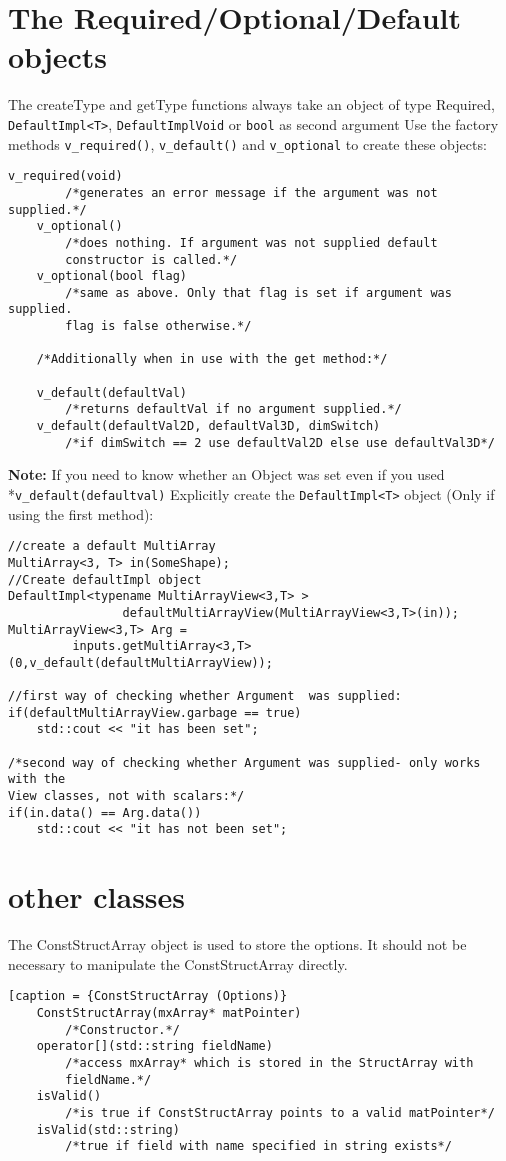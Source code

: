 \documentclass[a4paper,10pt]{article}
\begin{document}
\section{The Required/Optional/Default objects}
The createType and getType functions always take an object of type Required, 
\verb+DefaultImpl<T>+,  \verb+DefaultImplVoid+ or \verb+bool+ as second argument 
Use the factory methods \verb+v_required()+, \verb+v_default()+ and 
\verb+v_optional+ to create these objects:

\begin{lstlisting}[caption={Behavior of the get/set functions with the factory objects}]
	v_required(void)
		/*generates an error message if the argument was not supplied.*/
	v_optional()
		/*does nothing. If argument was not supplied default 
		constructor is called.*/
	v_optional(bool flag)
		/*same as above. Only that flag is set if argument was supplied. 
		flag is false otherwise.*/
	
	/*Additionally when in use with the get method:*/
	
	v_default(defaultVal)
		/*returns defaultVal if no argument supplied.*/
	v_default(defaultVal2D, defaultVal3D, dimSwitch)
		/*if dimSwitch == 2 use defaultVal2D else use defaultVal3D*/
\end{lstlisting}

\textbf{Note:} 	If you need to know whether an Object was set even if you used \\*\verb+v_default(defaultval)+
	Explicitly create the \verb+DefaultImpl<T>+ object (Only if using the first method):

\begin{lstlisting}[caption={Finding out whether a default object was set}]	
//create a default MultiArray
MultiArray<3, T> in(SomeShape);
//Create defaultImpl object
DefaultImpl<typename MultiArrayView<3,T> > 
				defaultMultiArrayView(MultiArrayView<3,T>(in));
MultiArrayView<3,T> Arg = 
		 inputs.getMultiArray<3,T>(0,v_default(defaultMultiArrayView));

//first way of checking whether Argument  was supplied:
if(defaultMultiArrayView.garbage == true) 
	std::cout << "it has been set";

/*second way of checking whether Argument was supplied- only works with the 
View classes, not with scalars:*/
if(in.data() == Arg.data()) 
	std::cout << "it has not been set";
\end{lstlisting}

\section{other classes}
The ConstStructArray object is used to store the options.
It should not be necessary to manipulate the ConstStructArray directly.
\begin{lstlisting}[caption = {ConstStructArray (Options)}
	ConstStructArray(mxArray* matPointer)
		/*Constructor.*/
	operator[](std::string fieldName)
		/*access mxArray* which is stored in the StructArray with 
		fieldName.*/
	isValid()
		/*is true if ConstStructArray points to a valid matPointer*/
	isValid(std::string)
		/*true if field with name specified in string exists*/
\end{lstlisting}
\end{document}
